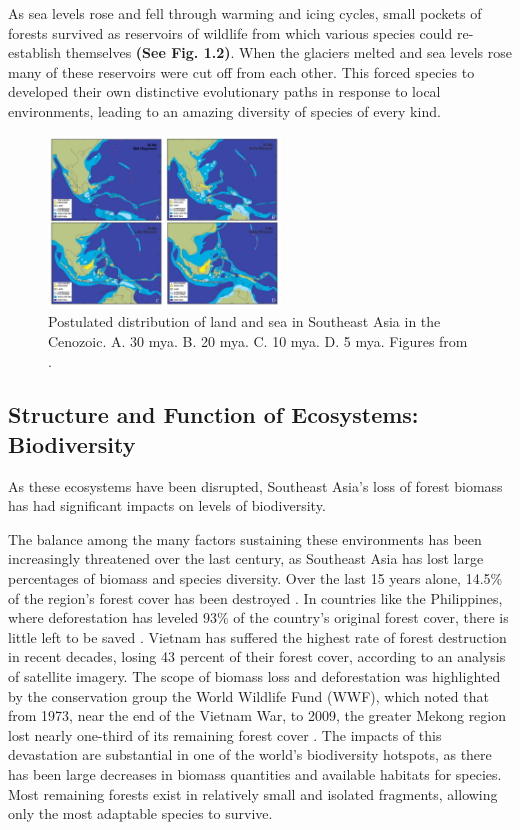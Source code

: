   As sea levels rose and fell through warming and icing cycles, small pockets of forests survived as reservoirs of wildlife from which various species could re-establish themselves \textbf{(See Fig. 1.2)}. When the glaciers melted and sea levels rose many of these reservoirs were cut off from each other. This forced species to developed their own distinctive evolutionary paths in response to local environments, leading to an amazing diversity of species of every kind.
  
   \begin{figure}[ht]
    \centering
        \includegraphics[width = 0.55\textwidth]{graphics/geology.jpg}
        \caption{Postulated distribution of land and sea in Southeast Asia in the Cenozoic. A. 30 mya. B. 20 mya. C. 10 mya. D. 5 mya. Figures from \cite{hall2002cenozoic}.}
    \end{figure} 

\subsection{Structure and Function of Ecosystems: Biodiversity}

 As these ecosystems have been disrupted, Southeast Asia's loss of forest biomass has had significant impacts on levels of biodiversity. 
 
 The balance among the many factors sustaining these environments has been increasingly threatened over the last century, as Southeast Asia has lost large percentages of biomass and species diversity.  Over the last 15 years alone, 14.5\% of the region's forest cover has been destroyed \citep{gullison2007tropical}.  In countries like the Philippines, where deforestation has leveled 93\% of the country's original forest cover, there is little left to be saved \citep{sodhi2004southeast}. Vietnam has suffered the highest rate of forest destruction in recent decades, losing 43 percent of their forest cover, according to an analysis of satellite imagery. The scope of biomass loss and deforestation was highlighted by the conservation group the World Wildlife Fund (WWF), which noted that from 1973, near the end of the Vietnam War, to 2009, the greater Mekong region lost nearly one-third of its remaining forest cover \citep{sunderland2012evidence}. The impacts of this devastation are substantial in one of the world's biodiversity hotspots, as there has been large decreases in biomass quantities and available habitats for species. Most remaining forests exist in relatively small and isolated fragments, allowing only the most adaptable species to survive.
 


